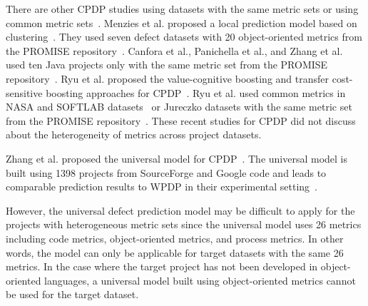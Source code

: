 There are other CPDP studies using datasets with the same metric sets or using common metric sets~\cite{Canfora13,me12d,promise12,Panichella14,Zhang15,Ryu14,Ryu15}.
Menzies et al. proposed a local prediction model based on clustering~\cite{me12d}. They used seven defect datasets with 20 object-oriented metrics from the PROMISE repository~\cite{me12d,promise12}.
Canfora et al., Panichella et al., and Zhang et al.
used ten Java projects only with the same metric set from the PROMISE
repository~\cite{Canfora13,promise12,Panichella14,Zhang15}.
Ryu et al. proposed the value-cognitive boosting and transfer cost-sensitive boosting approaches for CPDP~\cite{Ryu14,Ryu15}. Ryu et al. used common metrics in NASA and SOFTLAB datasets~\cite{Ryu14} or Jureczko datasets with the same metric set from the PROMISE repository~\cite{Ryu15}. These recent studies for CPDP did not discuss about the heterogeneity of metrics across project datasets.




Zhang et al. proposed the universal model for CPDP~\cite{Zhang14}.
The universal model is
built using 1398 projects from SourceForge and Google code and leads to
comparable prediction results to WPDP in their experimental
setting~\cite{Zhang14}.

However, the universal defect prediction model may be difficult to apply for the
projects with heterogeneous metric sets since the universal
model uses 26 metrics including code metrics, object-oriented metrics, and
process metrics. In other words, the model can only be applicable for
target datasets with the same 26 metrics. In the case where the target project
has not been developed in object-oriented languages, a universal model built
using object-oriented metrics cannot be used for the target dataset.

